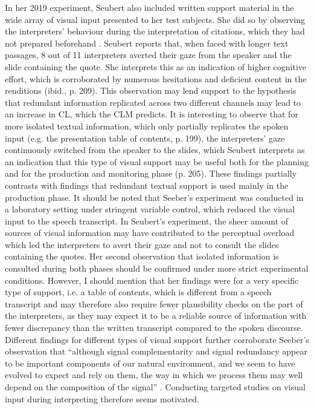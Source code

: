 In her 2019 experiment, Seubert also included written support material in the wide array of visual input presented to her test subjects. She did so by observing the interpreters' behaviour during the interpretation of citations, which they had not prepared beforehand \citep[198]{seubert_visuelle_2019}. Seubert reports that, when faced with longer text passages, 8 out of 11 interpreters averted their gaze from the speaker and the slide containing the quote. She interprets this as an indication of higher cognitive effort, which is corroborated by numerous hesitations and deficient content in the renditions (ibid., p. 209). This observation may lend support to the hypothesis that redundant information replicated across two different channels may lead to an increase in CL, which the CLM predicts. It is interesting to observe that for more isolated textual information, which only partially replicates the spoken input (e.g. the presentation table of contents, p. 199), the interpreters' gaze continuously switched from the speaker to the slides, which Seubert interprets as an indication that this type of visual support may be useful both for the planning and for the production and monitoring phase (p. 205). These findings partially contrasts with  findings that redundant textual support is used mainly in the production phase. It should be noted that Seeber's experiment was conducted in a laboratory setting under stringent variable control, which reduced the visual input to the speech transcript. In Seubert's experiment, the sheer amount of sources of visual information may have contributed to the perceptual overload which led the interpreters to avert their gaze and not to consult the slides containing the quotes. Her second observation that isolated information is consulted during both phases should be confirmed under more strict experimental conditions. However, I should mention that her findings were for a very specific type of support, i.e. a table of contents, which is different from a speech transcript and may therefore also require fewer plausibility checks on the part of the interpreters, as they may expect it to be a reliable source of information with fewer discrepancy than the written transcript compared to the spoken discourse. Different findings for different types of visual support further corroborate Seeber's observation that ``although signal complementarity and signal redundancy appear to be important components of our natural environment, and we seem to have evolved to expect and rely on them, the way in which we process them may well depend on the composition of the signal'' \citep[463]{seeber_multimodal_2017}. Conducting targeted studies on visual input during interpreting therefore seems motivated.

